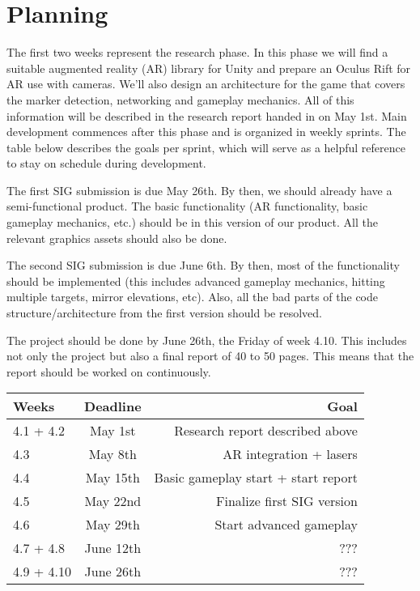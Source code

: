\section{Planning}

The first two weeks represent the research phase. In this phase we will find a suitable augmented reality (AR) library for Unity and prepare an Oculus Rift for AR use with cameras. We'll also design an architecture for the game that covers the marker detection, networking and gameplay mechanics. All of this information will be described in the research report handed in on May 1st. Main development commences after this phase and is organized in weekly sprints. The table below describes the goals per sprint, which will serve as a helpful reference to stay on schedule during development.

The first SIG submission is due May 26th. By then, we should already have a semi-functional product. The basic functionality (AR functionality, basic gameplay mechanics, etc.) should be in this version of our product. All the relevant graphics assets should also be done.

The second SIG submission is due June 6th. By then, most of the functionality should be implemented (this includes advanced gameplay mechanics, hitting multiple targets, mirror elevations, etc). Also, all the bad parts of the code structure/architecture from the first version should be resolved.

The project should be done by June 26th, the Friday of week 4.10. This includes not only the project but also a final report of 40 to 50 pages. This means that the report should be worked on continuously.
 
\begin{tabular}{|l|c|r|}
	\hline
	Weeks      & Deadline  & Goal \\ \hline
	4.1 + 4.2  & May 1st   & Research report described above \\ \hline
	4.3        & May 8th   & AR integration + lasers \\ \hline
	4.4        & May 15th  & Basic gameplay start + start report \\ \hline
	4.5        & May 22nd  & Finalize first SIG version \\ \hline
	4.6        & May 29th  & Start advanced gameplay \\ \hline
	4.7 + 4.8  & June 12th & ??? \\ \hline
	4.9 + 4.10 & June 26th & ??? \\ \hline
\end{tabular}

